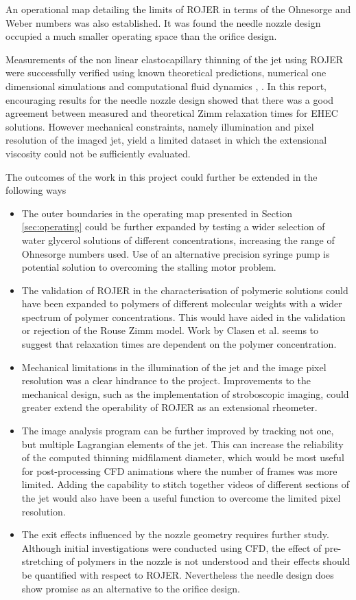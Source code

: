 \documentclass[11pt]{article}
\begin{document}
An operational map detailing the limits of ROJER in terms of the Ohnesorge and Weber numbers was also established. It was found the needle nozzle design occupied a much smaller operating space than the orifice design.

Measurements of the non linear elastocapillary thinning of the jet using ROJER were successfully verified using known theoretical predictions, numerical one dimensional simulations \cite{hall2015report} and computational fluid dynamics \cite{gorbatenko2015report}, \cite{greiciunas2015report}. In this report, encouraging results for the needle nozzle design showed that there was a good agreement between measured and theoretical Zimm relaxation times for EHEC solutions. However mechanical constraints, namely illumination and pixel resolution of the imaged jet, yield a limited dataset in which the extensional viscosity could not be sufficiently evaluated.

The outcomes of the work in this project could further be extended in the following ways
\begin{itemize}
	\item The outer boundaries in the operating map presented in Section \ref{sec:operating} could be further expanded by testing a wider selection of water glycerol solutions of different concentrations, increasing the range of Ohnesorge numbers used. Use of an alternative precision syringe pump is potential solution to overcoming the stalling motor problem.
	\item The validation of ROJER in the characterisation of polymeric solutions could have been expanded to polymers of different molecular weights with a wider spectrum of polymer concentrations. This would have aided in the validation or rejection of the Rouse Zimm model. Work by Clasen et al. \cite{clasen2006dilute} seems to suggest that relaxation times are dependent on the polymer concentration.
	\item Mechanical limitations in the illumination of the jet and the image pixel resolution was a clear hindrance to the project. Improvements to the mechanical design, such as the implementation of stroboscopic imaging, could greater extend the operability of ROJER  as an extensional rheometer.
	\item The image analysis program can be further improved by tracking not one, but multiple Lagrangian elements of the jet. This can increase the reliability of the computed thinning midfilament diameter, which would be most useful for post-processing CFD animations where the number of frames was more limited. Adding the capability to stitch together videos of different sections of the jet would also have been a useful function to overcome the limited pixel resolution.
	\item The exit effects influenced by the nozzle geometry requires further study. Although initial investigations were conducted using CFD, the effect of pre-stretching of polymers in the nozzle is not understood and their effects should be quantified with respect to ROJER. Nevertheless the needle design does show promise as an alternative to the orifice design.
\end{itemize}
\end{document}
